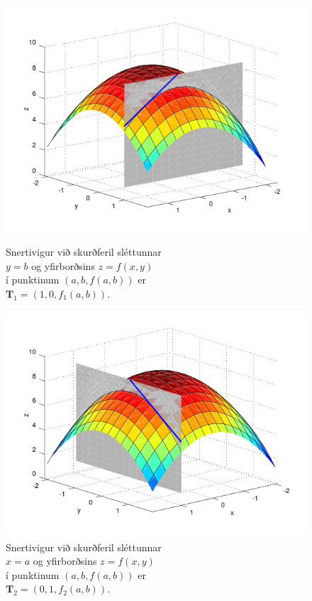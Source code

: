 \begin{figure}[!h]
        \centering
        \begin{minipage}{\textwidth}
            \centering
            \includegraphics[width=1\linewidth]{xpart.png}
            \caption*{Snertivigur við skurðferil sléttunnar \\ $y=b$ og yfirborðsins $z = f(x,y)$ \\ í punktinum $(a,b,f(a,b))$ er \\ $\mathbf{T}_1 = (1,0,f_1(a,b))$.}
        \end{minipage}%
        \begin{minipage}{\textwidth}
            \centering
            \includegraphics[width=1\linewidth]{ypart.png}
            \caption*{Snertivigur við skurðferil sléttunnar \\ $x=a$ og yfirborðsins $z = f(x,y)$ \\ í punktinum $(a,b,f(a,b))$ er \\ $\mathbf{T}_2 = (0,1,f_2(a,b))$.}
        \end{minipage}
\end{figure}
 
